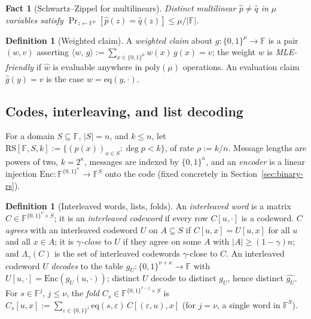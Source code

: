 \documentclass[11pt]{article}
\newcommand{\F}{\mathbb{F}}
\newcommand{\eq}{\mathrm{eq}}
\newcommand{\Enc}{\mathrm{Enc}}
\newcommand{\RS}{\mathrm{RS}}
\newcommand{\Lam}{\Lambda}
\newcommand{\cube}[1]{\{0,1\}^{#1}}
\newcommand{\inner}[2]{\langle #1,\, #2 \rangle}
\newcommand{\pol}[1]{\widehat{#1}}
\theoremstyle{plain}
\newtheorem{fact}[theorem]{Fact}
\theoremstyle{definition}
\newtheorem{definition}[theorem]{Definition}
\theoremstyle{remark}
\begin{document}
\begin{fact}[Schwartz--Zippel for multilinears]\label{fact:sz}
Distinct multilinear $\pol{p} \neq \pol{q}$ in $\mu$ variables satisfy $\Pr_{z \leftarrow \F^{\mu}}[\pol{p}(z) = \pol{q}(z)] \le \mu / |\F|$.
\end{fact}

\begin{definition}[Weighted claim]\label{def:claim}
A \emph{weighted claim} about $g : \cube{\mu} \to \F$ is a pair $(w, v)$ asserting $\inner{w}{g} := \sum_{x \in \cube{\mu}} w(x)\, g(x) = v$; the weight $w$ is \emph{MLE-friendly} if $\pol{w}$ is evaluable anywhere in $\mathrm{poly}(\mu)$ operations. An evaluation claim $\pol{g}(y) = v$ is the case $w = \eq(y, \cdot)$.
\end{definition}

\subsection{Codes, interleaving, and list decoding}\label{sec:codes}

For a domain $S \subseteq \F$, $|S| = n$, and $k \le n$, let $\RS[\F, S, k] := \{ (p(x))_{x \in S} : \deg p < k \}$, of rate $\rho := k/n$. Message lengths are powers of two, $k = 2^{\kappa}$, messages are indexed by $\cube{\kappa}$, and an \emph{encoder} is a linear injection $\Enc : \F^{\cube{\kappa}} \to \F^{S}$ onto the code (fixed concretely in Section~\ref{sec:binary-rs}).

\begin{definition}[Interleaved words, lists, folds]\label{def:interleaved}
An \emph{interleaved word} is a matrix $C \in \F^{\cube{\nu} \times S}$; it is an \emph{interleaved codeword} if every row $C[u, \cdot]$ is a codeword. $C$ \emph{agrees} with an interleaved codeword $U$ on $A \subseteq S$ if $C[u,x] = U[u,x]$ for all $u$ and all $x \in A$; it is \emph{$\gamma$-close} to $U$ if they agree on some $A$ with $|A| \ge (1-\gamma)n$; and $\Lam_\gamma(C)$ is the set of interleaved codewords $\gamma$-close to $C$. An interleaved codeword $U$ \emph{decodes} to the table $g_U : \cube{\nu + \kappa} \to \F$ with $U[u, \cdot] = \Enc(g_U(u, \cdot))$; distinct $U$ decode to distinct $g_U$, hence distinct $\pol{g_U}$. For $s \in \F^{j}$, $j \le \nu$, the \emph{fold} $C_s \in \F^{\cube{\nu - j} \times S}$ is $C_s[u, x] := \sum_{\varepsilon \in \cube{j}} \eq(s, \varepsilon)\, C[(\varepsilon, u), x]$ (for $j = \nu$, a single word in $\F^{S}$).
\end{definition}
\end{document}
